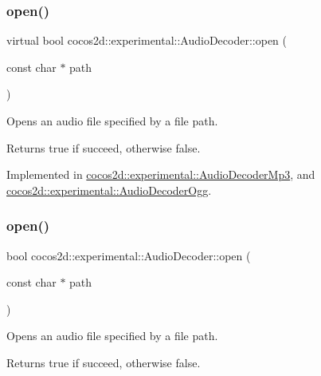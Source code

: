 \subsubsection{\texorpdfstring{open()}{open()}\hspace{0.1cm}{\footnotesize\ttfamily [1/2]}}
{\footnotesize\ttfamily virtual bool cocos2d\+::experimental\+::\+Audio\+Decoder\+::open (\begin{DoxyParamCaption}\item[{const char $\ast$}]{path }\end{DoxyParamCaption})\hspace{0.3cm}{\ttfamily [pure virtual]}}



Opens an audio file specified by a file path. 

\begin{DoxyReturn}{Returns}
true if succeed, otherwise false. 
\end{DoxyReturn}


Implemented in \hyperlink{classcocos2d_1_1experimental_1_1AudioDecoderMp3_adb47b02e2c9774cb069f393c5a63608a}{cocos2d\+::experimental\+::\+Audio\+Decoder\+Mp3}, and \hyperlink{classcocos2d_1_1experimental_1_1AudioDecoderOgg_a7df966c2d88ddefe6fb4a49b8a1ceabb}{cocos2d\+::experimental\+::\+Audio\+Decoder\+Ogg}.

\mbox{\label{classcocos2d_1_1experimental_1_1AudioDecoder_aab596e1f3d3f5ab2cf8de5ddb356db07}} 
\subsubsection{\texorpdfstring{open()}{open()}\hspace{0.1cm}{\footnotesize\ttfamily [2/2]}}
{\footnotesize\ttfamily bool cocos2d\+::experimental\+::\+Audio\+Decoder\+::open (\begin{DoxyParamCaption}\item[{const char $\ast$}]{path }\end{DoxyParamCaption})}



Opens an audio file specified by a file path. 

\begin{DoxyReturn}{Returns}
true if succeed, otherwise false. 
\end{DoxyReturn}
\mbox{\label{classcocos2d_1_1experimental_1_1AudioDecoder_a952b42c3785402bac2166c8dd1af543c}} 
